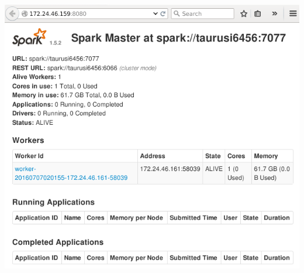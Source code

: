 \begin{frame}
    \centerline{\includegraphics[width=0.9\linewidth]{spark-main-view.png}}
\end{frame}

